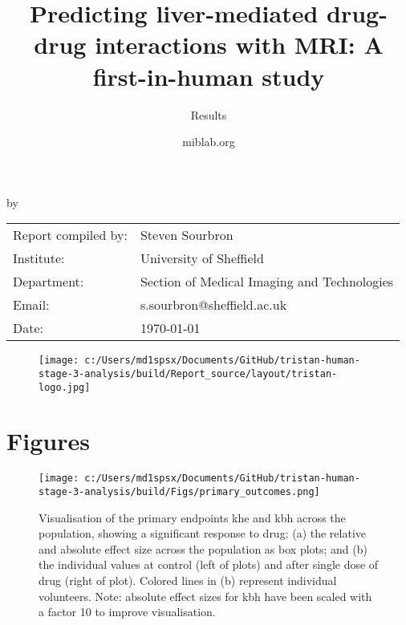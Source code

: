 \documentclass{epflreport}%
\begin{document}
%
\normalsize%
\frontmatter%
\title{Predicting liver{-}mediated drug{-}drug interactions with MRI: A first{-}in{-}human study}%
\subtitle{Results}%
\author{miblab.org}%
\subject{Internal report}%
%
%
%
\makecover%
\begin{titlepage}%
\begin{center}%
\makeatletter%
\largetitlestyle\fontsize{45}{45}\selectfont\@title%
\makeatother%
\linebreak%
\makeatletter%
\ifdefvoid{\@subtitle}{}{\bigskip\titlestyle\fontsize{20}{20}\selectfont\@subtitle}%
\makeatother%
\linebreak%
\bigskip%
\bigskip%
by%
\linebreak%
\bigskip%
\bigskip%
\makeatletter%
\largetitlestyle\fontsize{25}{25}\selectfont\@author%
\makeatother%
\vfill%
\large%
\begin{tabular}{ll}%
\hline%
Report compiled by: &Steven Sourbron\\%
Institute: &University of Sheffield\\%
Department: &Section of Medical Imaging and Technologies\\%
Email: &s.sourbron@sheffield.ac.uk\\%
Date: &\today\\%
\hline%
\end{tabular}%


\begin{figure}[b!]%
\centering%
\centering%
\texttt{[image: c:/Users/md1spsx/Documents/GitHub/tristan-human-stage-3-analysis/build/Report\_source/layout/tristan-logo.jpg]}%
\end{figure}

%
\end{center}%
\end{titlepage}%
\newpage%
\tableofcontents%
\mainmatter%
\clearpage%
\chapter{Figures}%
\clearpage%


\begin{figure}[h!]%
\centering%
\texttt{[image: c:/Users/md1spsx/Documents/GitHub/tristan-human-stage-3-analysis/build/Figs/primary\_outcomes.png]}%
\caption{Visualisation of the primary endpoints khe and kbh across the population, showing a significant response to drug: (a) the relative and absolute effect size across the population as box plots; and (b) the individual values at control (left of plots) and after single dose of drug (right of plot). Colored lines in (b) represent individual volunteers. Note: absolute effect sizes for kbh have been scaled with a factor 10 to improve visualisation.}%
\end{figure}
\end{document}
